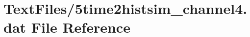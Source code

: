 \hypertarget{5time2histsim__channel4_8dat}{}\section{Text\+Files/5time2histsim\+\_\+channel4.dat File Reference}
\label{5time2histsim__channel4_8dat}
